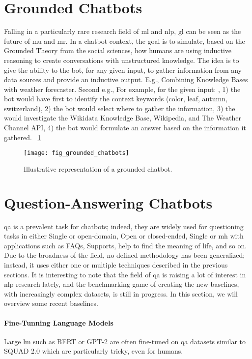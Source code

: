 \section{Grounded Chatbots}
\label{chatbot:grounded}
Falling in a particularly rare research field of \gls{ml} and \gls{nlp}, \gls{gl} can be seen as the future of \gls{mu} and \gls{mr}. In a chatbot context, the goal is to simulate, based on the Grounded Theory from the social sciences, how humans are using inductive reasoning to create conversations with unstructured knowledge. The idea is to give the ability to the bot, for any given input, to gather information from any data sources and provide an inductive output. E.g., Combining Knowledge Bases with weather forecaster. Second e.g., For example, for the given input: , 1) the bot would have first to identify the context keywords (color, leaf, autumn, switzerland), 2) the bot would select where to gather the information, 3) the would investigate the Wikidata Knowledge Base, Wikipedia, and The Weather Channel API, 4) the bot would formulate an answer based on the information it gathered. ~\ref{fig:fig_grounded_chatbots}

\begin{figure}
    \centering
    \texttt{[image: fig\_grounded\_chatbots]}
    \caption{Illustrative representation of a grounded chatbot.}
    \label{fig:fig_grounded_chatbots}
\end{figure}

\section{Question-Answering Chatbots}
\gls{qa} is a prevalent task for chatbots; indeed, they are widely used for questioning tasks in either Single or \gls{open-domain}, Open or \gls{closed-ended}, Single or \gls{mh} with applications such as FAQs, Supports, help to find the meaning of life, and so on. Due to the broadness of the field, no defined methodology has been generalized; instead, it uses either one or multiple techniques described in the previous sections. It is interesting to note that the field of \gls{qa} is raising a lot of interest in \gls{nlp} research lately, and the benchmarking game of creating the new baselines, with increasingly complex datasets, is still in progress. In this section, we will overview some recent baselines.

\paragraph{Fine-Tunning Language Models} Large \gls{lm} such as BERT \autocite{paper:devlin-etal-2019-bert} or GPT-2 \autocite{papers:gpt2} are often fine-tuned on \gls{qa} datasets similar to SQUAD 2.0 \autocite{paper:rajpurkar-etal-2018-know} which are particularly tricky, even for humans.


